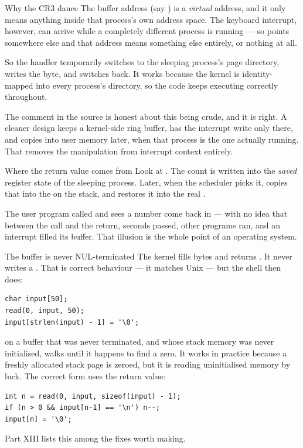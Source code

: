 \begin{concept}{Why the CR3 dance}
The buffer address (say ) is a \emph{virtual} address, and it only means anything
inside that process's own address space. The keyboard interrupt, however, can arrive while a
completely different process is running --- so  points somewhere else and that address
means something else entirely, or nothing at all.

So the handler temporarily switches  to the sleeping process's page directory, writes the
byte, and switches back. It works because the kernel is identity-mapped into every process's
directory, so the code keeps executing correctly throughout.

The comment in the source is honest about this being crude, and it is right. A cleaner design keeps
a kernel-side ring buffer, has the interrupt write only there, and copies into user memory later,
when that process is the one actually running. That removes the  manipulation from
interrupt context entirely.
\end{concept}

\begin{concept}{Where the return value comes from}
Look at . The count is written into the \emph{saved}
register state of the sleeping process. Later, when the scheduler picks it, 
copies that into the  on the stack, and  restores it into the real
.

The user program called  and sees a number come back in  --- with no idea that
between the call and the return, seconds passed, other programs ran, and an interrupt filled its
buffer. That illusion is the whole point of an operating system.
\end{concept}

\begin{danger}{The buffer is never NUL-terminated}
The kernel fills  bytes and returns . It never writes a . That is correct behaviour --- it matches Unix  --- but the shell then does:
\begin{lstlisting}[style=c]
char input[50];
read(0, input, 50);
input[strlen(input) - 1] = '\0';
\end{lstlisting}
 on a buffer that was never terminated, and whose stack memory was never initialised,
walks until it happens to find a zero. It works in practice because a freshly allocated stack page
is zeroed, but it is reading uninitialised memory by luck. The correct form uses the return value:
\begin{lstlisting}[style=c]
int n = read(0, input, sizeof(input) - 1);
if (n > 0 && input[n-1] == '\n') n--;
input[n] = '\0';
\end{lstlisting}
Part XIII lists this among the fixes worth making.
\end{danger}

